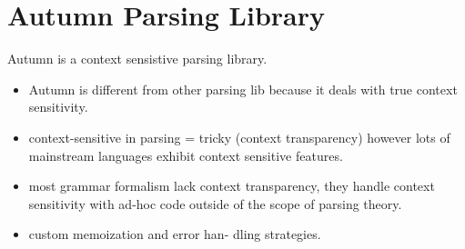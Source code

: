 


	\section{Autumn Parsing Library}
	\label{sec:autumn}
	Autumn is a context sensistive parsing library.
	\begin{itemize}
		\item Autumn is different from other parsing lib because it deals with true context sensitivity.
		\item context-sensitive in parsing = tricky (context transparency) however lots of mainstream languages exhibit context sensitive features.
		\item most grammar formalism lack context transparency, they handle context sensitivity with ad-hoc code outside of the scope of parsing theory.
		\item custom memoization and error han- dling strategies.

	\end{itemize}

